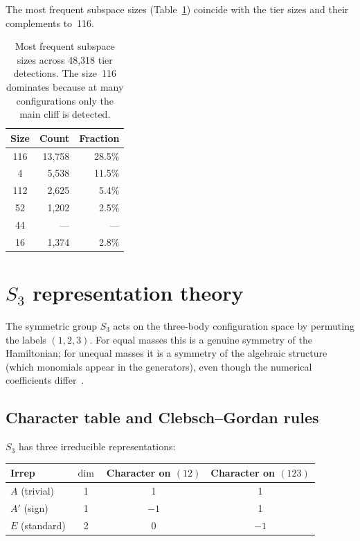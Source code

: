 \documentclass[11pt,a4paper]{article}
\theoremstyle{remark}
\newcommand{\SG}{S_3}
\begin{document}
The most frequent subspace sizes (Table~\ref{tab:sizes})
coincide with the tier sizes and their complements to~116.

\begin{table}[ht]
\centering
\begin{tabular}{@{}crr@{}}
\toprule
Size & Count & Fraction \\
\midrule
116 & 13{,}758 & 28.5\% \\
4   & 5{,}538  & 11.5\% \\
112 & 2{,}625  & 5.4\% \\
52  & 1{,}202  & 2.5\% \\
44  & --- & --- \\
16  & 1{,}374  & 2.8\% \\
\bottomrule
\end{tabular}
\caption{Most frequent subspace sizes across 48{,}318
  tier detections.  The size~116 dominates because at many
  configurations only the main cliff is detected.}
\label{tab:sizes}
\end{table}


\section{$S_3$ representation theory}
\label{sec:s3}

The symmetric group $\SG$ acts on the three-body
configuration space by permuting the labels
$(1,2,3)$.  For equal masses this is a genuine symmetry
of the Hamiltonian; for unequal masses it is a symmetry
of the algebraic structure (which monomials appear in the
generators), even though the numerical coefficients
differ~\cite{paper1}.

\subsection{Character table and Clebsch--Gordan rules}

$\SG$ has three irreducible representations:
\begin{center}
\begin{tabular}{@{}lccc@{}}
\toprule
Irrep & $\dim$ & Character on $(12)$ & Character on $(123)$ \\
\midrule
$A$ (trivial) & 1 & 1 & 1 \\
$A'$ (sign) & 1 & $-1$ & 1 \\
$E$ (standard) & 2 & 0 & $-1$ \\
\bottomrule
\end{tabular}
\end{center}
\end{document}
